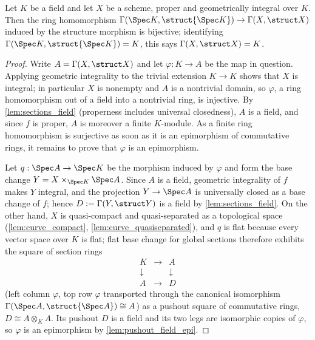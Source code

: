 \begin{theorem}
  \label{thm:sections_k}
  \leanok
  Let \(K\) be a field and let \(X\) be a scheme, proper and geometrically integral over
  \(K\). Then the ring homomorphism
  \(\Gamma(\Spec K, \struct{\Spec K}) \to \Gamma(X, \struct X)\) induced by the structure
  morphism is bijective; identifying \(\Gamma(\Spec K, \struct{\Spec K}) = K\), this says
  \(\Gamma(X, \struct X) = K\).
\end{theorem}
\begin{proof}
  \leanok
  Write \(A = \Gamma(X, \struct X)\) and let \(\varphi : K \to A\) be the map in question.
  Applying geometric integrality to the trivial extension \(K \to K\) shows that \(X\) is
  integral; in particular \(X\) is nonempty and \(A\) is a nontrivial domain, so \(\varphi\),
  a ring homomorphism out of a field into a nontrivial ring, is injective. By
  \ref{lem:sections_field} (properness includes universal closedness), \(A\) is a field, and
  since \(f\) is proper, \(A\) is moreover a finite \(K\)-module. As a finite ring
  homomorphism is surjective as soon as it is an epimorphism of commutative rings, it remains
  to prove that \(\varphi\) is an epimorphism.

  Let \(q : \Spec A \to \Spec K\) be the morphism induced by \(\varphi\) and form the base
  change \(Y = X \times_{\Spec K} \Spec A\). Since \(A\) is a field, geometric integrality of
  \(f\) makes \(Y\) integral, and the projection \(Y \to \Spec A\) is universally closed as a
  base change of \(f\); hence \(D := \Gamma(Y, \struct Y)\) is a field by
  \ref{lem:sections_field}. On the other hand, \(X\) is quasi-compact and quasi-separated as
  a topological space (\ref{lem:curve_compact}, \ref{lem:curve_quasiseparated}), and \(q\) is
  flat because every vector space over \(K\) is flat; flat base change for global sections
  therefore exhibits the square of section rings
  \[
    \begin{array}{ccc}
      K & \longrightarrow & A \\
      \downarrow & & \downarrow \\
      A & \longrightarrow & D
    \end{array}
  \]
  (left column \(\varphi\), top row \(\varphi\) transported through the canonical isomorphism
  \(\Gamma(\Spec A, \struct{\Spec A}) \cong A\)) as a pushout square of commutative rings,
  \(D \cong A \otimes_K A\). Its pushout \(D\) is a field and its two legs are isomorphic
  copies of \(\varphi\), so \(\varphi\) is an epimorphism by \ref{lem:pushout_field_epi}.
\end{proof}

